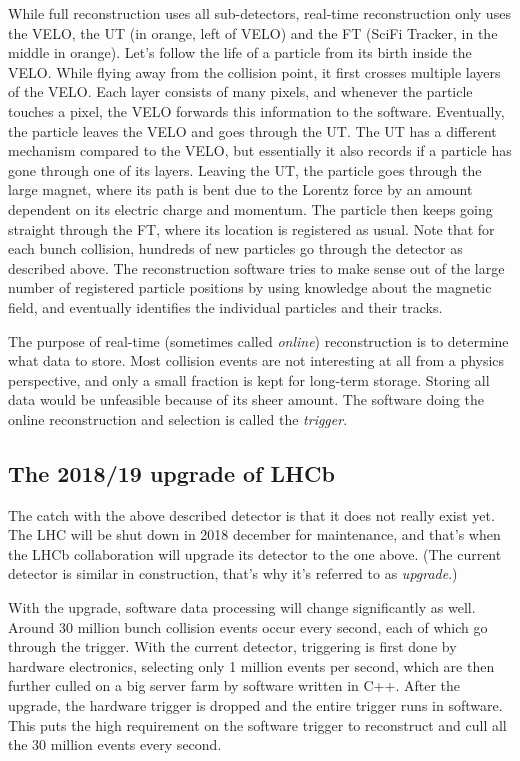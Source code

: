 \documentclass[12pt]{article}
\begin{document}
While full reconstruction uses all sub-detectors, real-time reconstruction only uses the VELO, the UT (in orange, left of VELO) and the FT (SciFi Tracker, in the middle in orange). Let's follow the life of a particle from its birth inside the VELO. While flying away from the collision point, it first crosses multiple layers of the VELO. Each layer consists of many pixels, and whenever the particle touches a pixel, the VELO forwards this information to the software. Eventually, the particle leaves the VELO and goes through the UT. The UT has a different mechanism compared to the VELO, but essentially it also records if a particle has gone through one of its layers. Leaving the UT, the particle goes through the large magnet, where its path is bent due to the Lorentz force by an amount dependent on its electric charge and momentum. The particle then keeps going straight through the FT, where its location is registered as usual. Note that for each bunch collision, hundreds of new particles go through the detector as described above. The reconstruction software tries to make sense out of the large number of registered particle positions by using knowledge about the magnetic field, and eventually identifies the individual particles and their tracks.

The purpose of real-time (sometimes called \textit{online}) reconstruction is to determine what data to store. Most collision events are not interesting at all from a physics perspective, and only a small fraction is kept for long-term storage. Storing all data would be unfeasible because of its sheer amount. The software doing the online reconstruction and selection is called the \textit{trigger}.

\subsection{The 2018/19 upgrade of LHCb}

The catch with the above described detector is that it does not really exist yet. The LHC will be shut down in 2018 december for maintenance, and that's when the LHCb collaboration will upgrade its detector to the one above. (The current detector is similar in construction, that's why it's referred to as \textit{upgrade}.)

With the upgrade, software data processing will change significantly as well. Around 30 million bunch collision events occur every second, each of which go through the trigger. With the current detector, triggering is first done by hardware electronics, selecting only 1 million events per second, which are then further culled on a big server farm by software written in C++. After the upgrade, the hardware trigger is dropped and the entire trigger runs in software. This puts the high requirement on the software trigger to reconstruct and cull all the 30 million events every second.
\end{document}
